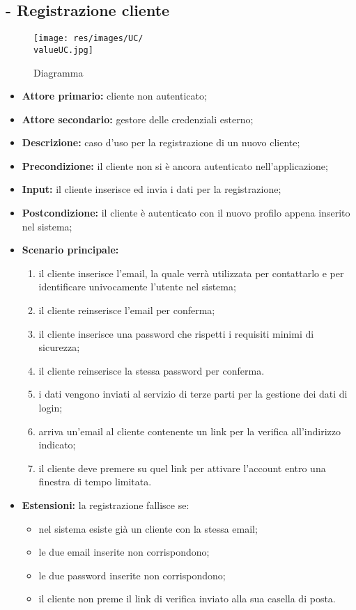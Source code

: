 \subsection{ - Registrazione cliente}
\begin{figure}[H]
    \centering
    \texttt{[image: res/images/UC/\\valueUC.jpg]}
    \caption{Diagramma }
\end{figure}
\begin{itemize}
    \item \textbf{Attore primario:} cliente non autenticato;
    \item \textbf{Attore secondario:} gestore delle credenziali esterno;
    \item \textbf{Descrizione:} caso d'uso per la registrazione di un nuovo cliente;
    \item \textbf{Precondizione:} il cliente non si è ancora autenticato nell'applicazione;
    \item \textbf{Input:} il cliente inserisce ed invia i dati per la registrazione;
    \item \textbf{Postcondizione:} il cliente è autenticato con il nuovo profilo appena inserito nel sistema;
    \item \textbf{Scenario principale:}
          \begin{enumerate}
              \item il cliente inserisce l'email, la quale verrà utilizzata per contattarlo e per identificare univocamente l'utente nel sistema;
              \item il cliente reinserisce l'email per conferma;
              \item il cliente inserisce una password che rispetti i requisiti minimi di sicurezza;
              \item il cliente reinserisce la stessa password per conferma.
              \item i dati vengono inviati al servizio di terze parti per la gestione dei dati di login;
              \item arriva un'email al cliente contenente un link per la verifica all'indirizzo indicato;
              \item il cliente deve premere su quel link per attivare l'account entro una finestra di tempo limitata.
          \end{enumerate}
    \item \textbf{Estensioni:} la registrazione fallisce se:
          \begin{itemize}
              \item nel sistema esiste già un cliente con la stessa email;
              \item le due email inserite non corrispondono;
              \item le due password inserite non corrispondono;
              \item il cliente non preme il link di verifica inviato alla sua casella di posta.
          \end{itemize}
\end{itemize}

